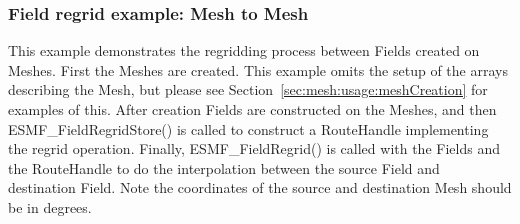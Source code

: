  
\setlength{\oldparskip}{\parskip}
\setlength{\parskip}{1.5ex}
\setlength{\oldparindent}{\parindent}
\setlength{\parindent}{0pt}
\setlength{\oldbaselineskip}{\baselineskip}
\setlength{\baselineskip}{11pt}
 
\def\bv{\begin{verbatim}}
\def\ev{\end{verbatim}}
\def\be{\begin{equation}}
\def\ee{\end{equation}}
\def\bea{\begin{eqnarray}}
\def\eea{\end{eqnarray}}
\def\bi{\begin{itemize}}
\def\ei{\end{itemize}}
\def\bn{\begin{enumerate}}
\def\en{\end{enumerate}}
\def\bd{\begin{description}}
\def\ed{\end{description}}
\def\({\left (}
\def\){\right )}
\def\[{\left [}
\def\]{\right ]}
\def\<{\left  \langle}
\def\>{\right \rangle}
\def\cI{{\cal I}}
\def\diag{\mathop{\rm diag}}
\def\tr{\mathop{\rm tr}}


 

  \subsubsection{Field regrid example: Mesh to Mesh}
   This example demonstrates the regridding process between Fields created on Meshes. First
   the Meshes are created. This example omits the setup of the arrays describing the Mesh, but please see
   Section~\ref{sec:mesh:usage:meshCreation} for examples of this. After creation Fields are constructed on the Meshes, 
   and then ESMF\_FieldRegridStore() is called to construct a RouteHandle implementing the regrid operation. Finally, ESMF\_FieldRegrid() is
   called with the Fields and the RouteHandle to do the interpolation between the source Field and 
   destination Field.  Note the coordinates of the source and destination Mesh should be in degrees.
    
